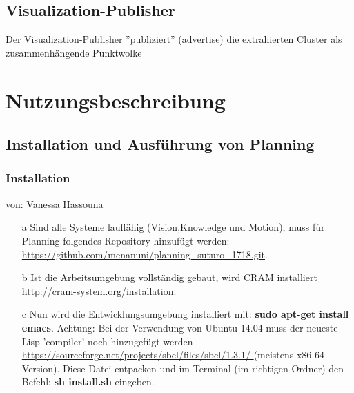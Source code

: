 \documentclass{suturo}
\makeatletter
\newcommand{\chapterauthor}[1]{%
  {\parindent0pt\vspace*{-27pt}%
  \linespread{0}\small\begin{flushright}von: #1\end{flushright}%
  \par\nobreak\vspace*{0pt}}
  \@afterheading%
}
\makeatother
\begin{document}
\subsection*{Visualization-Publisher}
Der Visualization-Publisher ''publiziert'' (advertise) die extrahierten Cluster als zusammenhängende Punktwolke

\newpage
\section{Nutzungsbeschreibung}

\subsection{Installation und Ausführung von Planning}

\subsubsection{Installation}
\chapterauthor{Vanessa Hassouna}
\begin{itemize}


\item[a] Sind alle Systeme lauffähig (Vision,Knowledge und Motion), muss für Planning folgendes Repository hinzufügt werden: \url{https://github.com/menanuni/planning_suturo_1718.git}. 

\item[b] Ist die Arbeitsumgebung vollständig gebaut, wird CRAM installiert \url{http://cram-system.org/installation}.

\item[c] Nun wird die Entwicklungsumgebung installiert mit: \textbf{sudo apt-get install emacs}. Achtung: Bei der Verwendung von Ubuntu 14.04 muss der neueste Lisp 'compiler' noch hinzugefügt werden \url{https://sourceforge.net/projects/sbcl/files/sbcl/1.3.1/
} (meistens x86-64 Version). Diese Datei entpacken und im Terminal (im richtigen Ordner) den Befehl: \textbf{sh install.sh} eingeben.
\end{itemize}
\end{document}
